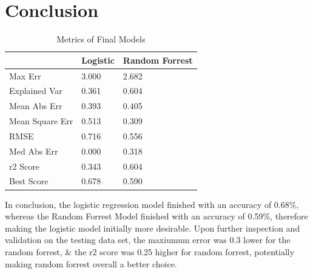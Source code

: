 \documentclass[11pt, a4paper, twocolumn]{article}
\begin{document}
\section{Conclusion}

\begin{table}[H]
	\centering
	\begin{tabular}{l|l|l|}
	\cline{2-3}
												   & Logistic & Random Forrest \\ \hline
	\multicolumn{1}{|l|}{Max Err}                  & 3.000                     & 2.682                           \\ \hline
	\multicolumn{1}{|l|}{Explained Var} 		   & 0.361                     & 0.604                           \\ \hline
	\multicolumn{1}{|l|}{Mean Abs Err}       	   & 0.393                     & 0.405                           \\ \hline
	\multicolumn{1}{|l|}{Mean Square Err}          & 0.513                     & 0.309                           \\ \hline
	\multicolumn{1}{|l|}{RMSE}   				   & 0.716                     & 0.556                           \\ \hline
	\multicolumn{1}{|l|}{Med Abs Err}    		   & 0.000                     & 0.318                           \\ \hline
	\multicolumn{1}{|l|}{r2 Score}                 & 0.343                     & 0.604                           \\ \hline
	\multicolumn{1}{|l|}{Best Score}               & 0.678                     & 0.590                           \\ \hline
	\end{tabular}
	\caption{Metrics of Final Models}
	\label{table:metrics}
\end{table}

In conclusion, the logistic regression model finished with an accuracy of 0.68\%, whereas the Random Forrest Model finished with an accuracy of 0.59\%, therefore making the logistic model initially more desirable.
Upon further inspection and validation on the testing data set, the maxiumum error was 0.3 lower for the random forrest, \& the r2 score was 0.25 higher for random forrest, potentially making random forrest overall a better choice.
\end{document}
